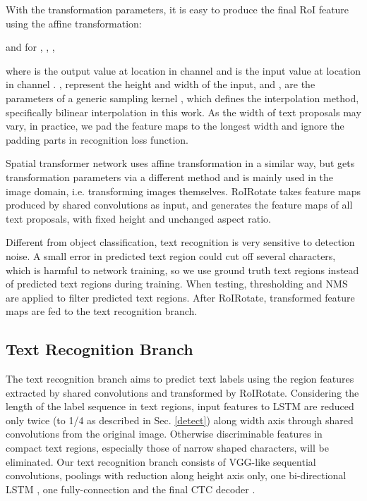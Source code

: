 \documentclass[10pt,twocolumn,letterpaper]{article}
\begin{document}
With the transformation parameters, it is easy to produce the final RoI feature using the affine transformation:

and for , , ,

where  is the output value at location  in channel  and  is the input value at location  in channel . ,  represent the height and width of the input, and ,  are the parameters of a generic sampling kernel , which defines the interpolation method, specifically bilinear interpolation in this work. As the width of text proposals may vary, in practice, we pad the feature maps to the longest width and ignore the padding parts in recognition loss function.

Spatial transformer network \cite{jaderberg2015stn} uses affine transformation in a similar way, but gets transformation parameters via a different method and is mainly used in the image domain, i.e. transforming images themselves. RoIRotate takes feature maps produced by shared convolutions as input, and generates the feature maps of all text proposals, with fixed height and unchanged aspect ratio.

Different from object classification, text recognition is very sensitive to detection noise. A small error in predicted text region could cut off several characters, which is harmful to network training, so we use ground truth text regions instead of predicted text regions during training. When testing, thresholding and NMS are applied to filter predicted text regions. After RoIRotate, transformed feature maps are fed to the text recognition branch.

\subsection{Text Recognition Branch}
\label{recog}
The text recognition branch aims to predict text labels using the region features extracted by shared convolutions and transformed by RoIRotate. Considering the length of the label sequence in text regions, input features to LSTM are reduced only twice (to 1/4 as described in Sec. \ref{detect}) along width axis through shared convolutions from the original image. Otherwise discriminable features in compact text regions, especially those of narrow shaped characters, will be eliminated. Our text recognition branch consists of VGG-like \cite{simonyan2014vgg} sequential convolutions, poolings with reduction along height axis only, one bi-directional LSTM \cite{schuster1997bidirectional,hochreiter1997lstm}, one fully-connection and the final CTC decoder \cite{graves2006ctc}.
\end{document}
